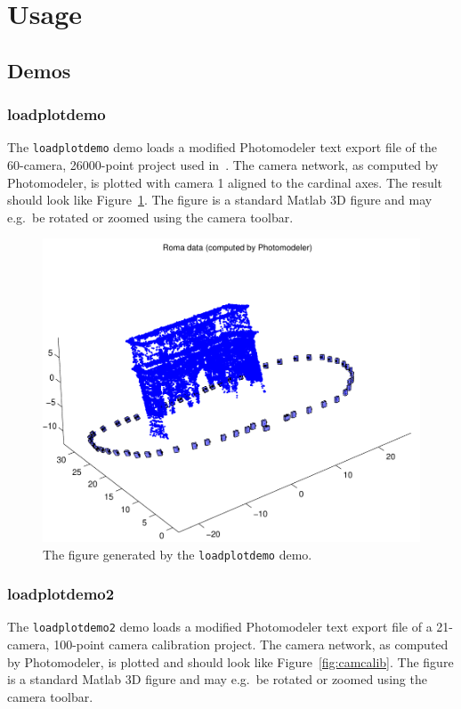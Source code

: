 \documentclass{article}
\begin{document}
\section{Usage}

\subsection{Demos}
\label{sec:demos}

\subsubsection{loadplotdemo}
\label{sec:loadplotdemo}
\label{sec:loadroma}

The \verb+loadplotdemo+ demo loads a modified Photomodeler text export
file of the 60-camera, 26000-point project used
in~\citet{Borlin2013:Bundle}. The camera network, as computed by
Photomodeler, is plotted with camera 1 aligned to the cardinal axes.
The result should look like Figure~\ref{fig:roma}. The figure is a
standard Matlab 3D figure and may e.g.\ be rotated or zoomed using the
camera toolbar.

\begin{figure}
  \centering
  \includegraphics[width=0.5\hsize]{ill/roma}
  \caption{The figure generated by the \texttt{loadplotdemo} demo.}
  \label{fig:roma}
\end{figure}

\subsubsection{loadplotdemo2}
\label{sec:camcaldata}

The \verb+loadplotdemo2+ demo loads a modified Photomodeler text
export file of a 21-camera, 100-point camera calibration project. The
camera network, as computed by Photomodeler, is plotted and should
look like Figure~\ref{fig:camcalib}. The figure is a standard Matlab
3D figure and may e.g.\ be rotated or zoomed using the camera toolbar.
\end{document}
